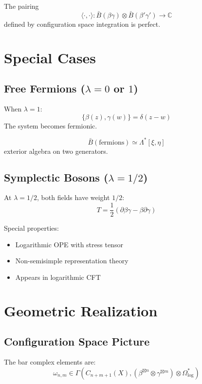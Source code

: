 \begin{proposition}
The pairing
$$\langle \cdot, \cdot \rangle: \bar{B}(\beta\gamma) \otimes \bar{B}(\beta'\gamma') \to \mathbb{C}$$
defined by configuration space integration is perfect.
\end{proposition}

\section{Special Cases}

\subsection{Free Fermions ($\lambda = 0$ or $1$)}

When $\lambda = 1$:
$$\{\beta(z), \gamma(w)\} = \delta(z-w)$$
The system becomes fermionic.

\begin{theorem}
$$\bar{B}(\text{fermions}) \simeq \Lambda^*[\xi, \eta]$$
exterior algebra on two generators.
\end{theorem}

\subsection{Symplectic Bosons ($\lambda = 1/2$)}

At $\lambda = 1/2$, both fields have weight $1/2$:
$$T = \frac{1}{2}(\partial\beta\gamma - \beta\partial\gamma)$$

Special properties:
\begin{itemize}
\item Logarithmic OPE with stress tensor
\item Non-semisimple representation theory
\item Appears in logarithmic CFT
\end{itemize}

\section{Geometric Realization}

\subsection{Configuration Space Picture}

The bar complex elements are:
$$\omega_{n,m} \in \Gamma(C_{n+m+1}(X), (\beta^{\boxtimes n} \otimes \gamma^{\boxtimes m}) \otimes \Omega^*_{\log})$$

